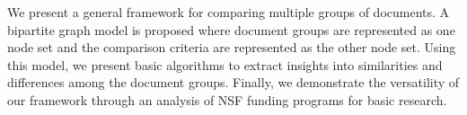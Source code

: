 We present a general framework for comparing multiple groups of documents. A bipartite graph model is proposed where document groups are represented as one node set and the comparison criteria are represented as the other node set. Using this model, we present basic algorithms to extract insights into similarities and differences among the document groups. Finally, we demonstrate the versatility of our framework through an analysis of NSF funding programs for basic research.

